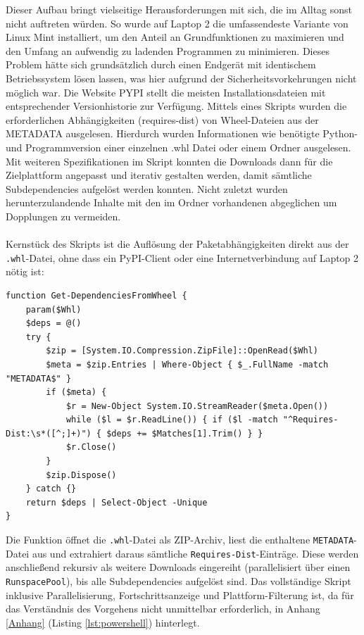 Dieser Aufbau bringt vielseitige Herausforderungen mit sich, die im Alltag sonst nicht auftreten würden. So wurde auf Laptop 2 die umfassendeste Variante von Linux Mint installiert, um den Anteil an Grundfunktionen zu maximieren und den Umfang an aufwendig zu ladenden Programmen zu minimieren. Dieses Problem hätte sich grundsätzlich durch einen Endgerät mit identischem Betriebssystem lösen lassen, was hier aufgrund der Sicherheitsvorkehrungen nicht möglich war. Die Website PYPI stellt die meisten Installationsdateien mit entsprechender Versionhistorie zur Verfügung.
Mittels eines Skripts wurden die erforderlichen Abhängigkeiten (requires-dist) von Wheel-Dateien aus der METADATA ausgelesen. Hierdurch wurden Informationen wie benötigte Python- und Programmversion einer einzelnen .whl Datei oder einem Ordner ausgelesen. Mit weiteren Spezifikationen im Skript konnten die Downloads dann für die Zielplattform angepasst und iterativ gestalten werden, damit sämtliche Subdependencies aufgelöst werden konnten. Nicht zuletzt wurden herunterzulandende Inhalte mit den im Ordner vorhandenen abgeglichen um Dopplungen zu vermeiden.\\ \\



Kernstück des Skripts ist die Auflösung der Paketabhängigkeiten direkt aus der \texttt{.whl}-Datei, ohne dass ein PyPI-Client oder eine Internetverbindung auf Laptop 2 nötig ist:

\begin{lstlisting}[caption=Kernfunktion des Powershell-Skripts: Abhängigkeitsauflösung aus der Wheel-METADATA]
function Get-DependenciesFromWheel {
    param($Whl)
    $deps = @()
    try {
        $zip = [System.IO.Compression.ZipFile]::OpenRead($Whl)
        $meta = $zip.Entries | Where-Object { $_.FullName -match "METADATA$" }
        if ($meta) {
            $r = New-Object System.IO.StreamReader($meta.Open())
            while ($l = $r.ReadLine()) { if ($l -match "^Requires-Dist:\s*([^;]+)") { $deps += $Matches[1].Trim() } }
            $r.Close()
        }
        $zip.Dispose()
    } catch {}
    return $deps | Select-Object -Unique
}
\end{lstlisting}

Die Funktion öffnet die \texttt{.whl}-Datei als ZIP-Archiv, liest die enthaltene \texttt{METADATA}-Datei aus und extrahiert daraus sämtliche \texttt{Requires-Dist}-Einträge. Diese werden anschließend rekursiv als weitere Downloads eingereiht (parallelisiert über einen \texttt{RunspacePool}), bis alle Subdependencies aufgelöst sind. Das vollständige Skript inklusive Parallelisierung, Fortschrittsanzeige und Plattform-Filterung ist, da für das Verständnis des Vorgehens nicht unmittelbar erforderlich, in Anhang \ref{Anhang} (Listing \ref{lst:powershell}) hinterlegt.

